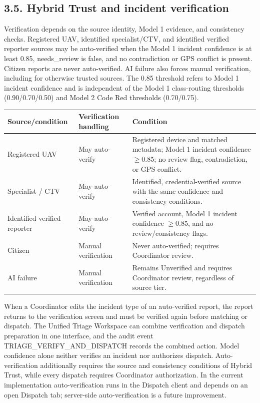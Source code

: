 \documentclass[pdflatex,sn-mathphys-ay]{sn-jnl}
\begin{document}
\subsection*{3.5. Hybrid Trust and incident verification}

Verification depends on the source identity, Model 1 evidence, and consistency checks. Registered UAV, identified specialist/CTV, and identified verified reporter sources may be auto-verified when the Model 1 incident confidence is at least 0.85, needs\_review is false, and no contradiction or GPS conflict is present. Citizen reports are never auto-verified. AI failure also forces manual verification, including for otherwise trusted sources. The 0.85 threshold refers to Model 1 incident confidence and is independent of the Model 1 class-routing thresholds (0.90/0.70/0.50) and Model 2 Code Red thresholds (0.70/0.75).
\vspace{8pt}

\begin{center}
\small
\renewcommand{\arraystretch}{1.15}
\setlength{\tabcolsep}{3pt}
\begin{tabularx}{\textwidth}{|X|X|X|}\hline
Source/condition & Verification handling & Condition \\ \hline
Registered UAV & May auto-verify & Registered device and matched metadata; Model 1 incident confidence $\geq$0.85; no review flag, contradiction, or GPS conflict. \\ \hline
Specialist / CTV & May auto-verify & Identified, credential-verified source with the same confidence and consistency conditions. \\ \hline
Identified verified reporter & May auto-verify & Verified account, Model 1 incident confidence $\geq$0.85, and no review/consistency flags. \\ \hline
Citizen & Manual verification & Never auto-verified; requires Coordinator review. \\ \hline
AI failure & Manual verification & Remains Unverified and requires Coordinator review, regardless of source tier. \\ \hline
\end{tabularx}
\end{center}

When a Coordinator edits the incident type of an auto-verified report, the report returns to the verification screen and must be verified again before matching or dispatch. The Unified Triage Workspace can combine verification and dispatch preparation in one interface, and the audit event TRIAGE\_VERIFY\_AND\_DISPATCH records the combined action. Model confidence alone neither verifies an incident nor authorizes dispatch. Auto-verification additionally requires the source and consistency conditions of Hybrid Trust, while every dispatch requires Coordinator authorization. In the current implementation auto-verification runs in the Dispatch client and depends on an open Dispatch tab; server-side auto-verification is a future improvement.
\end{document}
